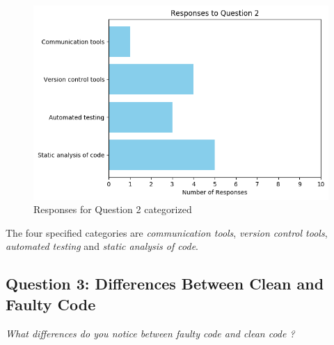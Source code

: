 \documentclass[../main.tex]{subfiles}
\begin{document}
\begin{figure}[H]
    \centering
    \includegraphics[scale=0.7]{images/Results/RQ2/RQ2_question_2.png}
    \caption{Responses for Question 2 categorized}
    \label{fig:rq2Image2}
\end{figure}

The four specified categories are \textit{communication tools}, \textit{version control tools}, \textit{automated testing} and \textit{static analysis of code}. 

\subsection{Question 3: Differences Between Clean and Faulty Code}

\textit{What differences do you notice between faulty code and clean code ?}
\end{document}
